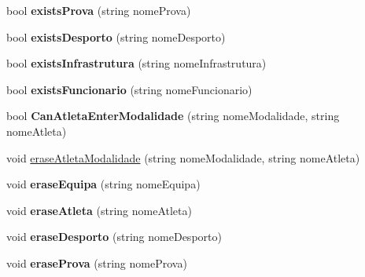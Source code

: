 \begin{DoxyCompactItemize}
\item 
\hypertarget{class_campeonato_ac246301cffebdadfc50c15b92fa73cbd}{}bool {\bfseries exists\+Prova} (string nome\+Prova)\label{class_campeonato_ac246301cffebdadfc50c15b92fa73cbd}

\item 
\hypertarget{class_campeonato_adfe05f4fe82ef6b27fb2f5107c85c3bf}{}bool {\bfseries exists\+Desporto} (string nome\+Desporto)\label{class_campeonato_adfe05f4fe82ef6b27fb2f5107c85c3bf}

\item 
\hypertarget{class_campeonato_ae69218519694b86b63da4118fdb3c563}{}bool {\bfseries exists\+Infrastrutura} (string nome\+Infrastrutura)\label{class_campeonato_ae69218519694b86b63da4118fdb3c563}

\item 
\hypertarget{class_campeonato_a532a52907e1e324168e4fc25c8f307fe}{}bool {\bfseries exists\+Funcionario} (string nome\+Funcionario)\label{class_campeonato_a532a52907e1e324168e4fc25c8f307fe}

\item 
\hypertarget{class_campeonato_a7f9818dfbb32ebfdff022b5194e1f268}{}bool {\bfseries Can\+Atleta\+Enter\+Modalidade} (string nome\+Modalidade, string nome\+Atleta)\label{class_campeonato_a7f9818dfbb32ebfdff022b5194e1f268}

\item 
void \hyperlink{class_campeonato_a80cf04fda33aa4f3d83d409e064aec01}{erase\+Atleta\+Modalidade} (string nome\+Modalidade, string nome\+Atleta)
\item 
\hypertarget{class_campeonato_a8e935d7b37d19565c317402d0a532a68}{}void {\bfseries erase\+Equipa} (string nome\+Equipa)\label{class_campeonato_a8e935d7b37d19565c317402d0a532a68}

\item 
\hypertarget{class_campeonato_acd7c3f6a223f822f66eab6af95602b8d}{}void {\bfseries erase\+Atleta} (string nome\+Atleta)\label{class_campeonato_acd7c3f6a223f822f66eab6af95602b8d}

\item 
\hypertarget{class_campeonato_a71bc500716b9fa2f65d5650625f94589}{}void {\bfseries erase\+Desporto} (string nome\+Desporto)\label{class_campeonato_a71bc500716b9fa2f65d5650625f94589}

\item 
\hypertarget{class_campeonato_acd4dd3e34af0e1cdc217c5a7d0233f9b}{}void {\bfseries erase\+Prova} (string nome\+Prova)\label{class_campeonato_acd4dd3e34af0e1cdc217c5a7d0233f9b}


\end{DoxyCompactItemize}
